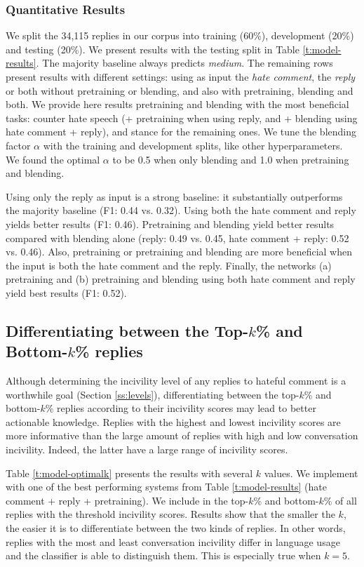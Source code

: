 \documentclass[11pt]{article}
\begin{document}
	\subsubsection{Quantitative Results}
	We split the 34,115 replies in our corpus into training (60\%), development (20\%) and testing (20\%).
	We present results with the testing split in Table \ref{t:model-results}.
	The majority baseline always predicts \emph{medium}.
	The remaining rows present results with different settings:
	using as input the \emph{hate comment}, the \emph{reply} or both without pretraining or blending, and also with
	pretraining, blending and both.
	We provide here results pretraining and blending with the most beneficial tasks:
	counter hate speech (+ pretraining when using reply, and + blending using hate comment + reply),
	and stance for the remaining ones.
	We tune the blending factor $\alpha$  with the training and development splits, like other hyperparameters.
	We found the optimal $\alpha$ to be 0.5 when only blending and 1.0 when pretraining and blending. 
	
	Using only the reply as input is a strong baseline: it substantially outperforms the majority baseline (F1: 0.44 vs. 0.32).
	Using both the hate comment and reply yields better results (F1: 0.46).
	Pretraining and blending yield better results compared with blending alone (reply: 0.49 vs. 0.45, hate comment + reply: 0.52 vs. 0.46).
	Also, pretraining or pretraining and blending are more beneficial when the input is both the hate comment and the reply.
	Finally, the networks (a) pretraining and (b) pretraining and blending using both hate comment and reply yield best results (F1: 0.52).

	
	\subsection{Differentiating between the Top-$k$\% and Bottom-$k$\% replies}
	\label{ss:topbottom}
	Although determining the incivility level of any replies to hateful comment is a worthwhile goal (Section \ref{ss:levels}),
	differentiating between the top-$k$\% and bottom-$k$\% replies according to their incivility scores may lead to better actionable knowledge.
	Replies with the highest and lowest incivility scores are more informative than the large amount of replies with high and low conversation incivility.
	Indeed, the latter have a large range of incivility scores.
	
	Table \ref{t:model-optimalk} presents the results with several $k$ values.
	We implement with one of the best performing systems from Table \ref{t:model-results} (hate comment + reply + pretraining).
	We include in the top-$k$\% and bottom-$k$\% of all replies with the threshold incivility scores.
	Results show that the smaller the $k$, the easier it is to differentiate between the two kinds of replies.
	In other words, replies with the most and least conversation incivility differ in language usage and the classifier is able to distinguish them.
	This is especially true when $k=5$.
\end{document}
